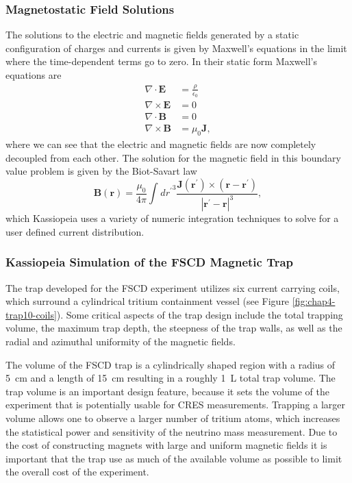 \subsubsection*{Magnetostatic Field Solutions}

The solutions to the electric and magnetic fields generated by a static configuration of charges and currents is given by Maxwell's equations in the limit where the time-dependent terms go to zero. In their static form Maxwell's equations \cite{jackson_classical_1999} are
\begin{align}
    \nabla\cdot\mathbf{E}&=\frac{\rho}{\epsilon_0}\\
    \nabla\times\mathbf{E}&=0\\
    \nabla\cdot\mathbf{B}&=0\\
    \nabla\times\mathbf{B}&=\mu_0\mathbf{J},
\end{align}
where we can see that the electric and magnetic fields are now completely decoupled from each other. The solution for the magnetic field in this boundary value problem is given by the Biot-Savart law
\begin{equation}
    \mathbf{B}(\mathbf{r}) = \frac{\mu_0}{4\pi}\int_{}^{}{d{r^{'}}^{3}\frac{\mathbf{J}(\mathbf{r}^{'})\times (\mathbf{r}-\mathbf{r}^{'})}{|\mathbf{r}^{'}-\mathbf{r}|^{3}}},
\end{equation}
which Kassiopeia uses a variety of numeric integration techniques to solve for a user defined current distribution.

\subsubsection*{Kassiopeia Simulation of the FSCD Magnetic Trap}

The trap developed for the FSCD experiment utilizes six current carrying coils, which surround a cylindrical tritium containment vessel (see Figure \ref{fig:chap4-trap10-coils}). Some critical aspects of the trap design include the total trapping volume, the maximum trap depth, the steepness of the trap walls, as well as the radial and azimuthal uniformity of the magnetic fields.

The volume of the FSCD trap is a cylindrically shaped region with a radius of 5~cm and a length of 15~cm resulting in a roughly 1~L total trap volume. The trap volume is an important design feature, because it sets the volume of the experiment that is potentially usable for CRES measurements. Trapping a larger volume allows one to observe a larger number of tritium atoms, which increases the statistical power and sensitivity of the neutrino mass measurement. Due to the cost of constructing magnets with large and uniform magnetic fields it is important that the trap use as much of the available volume as possible to limit the overall cost of the experiment.

